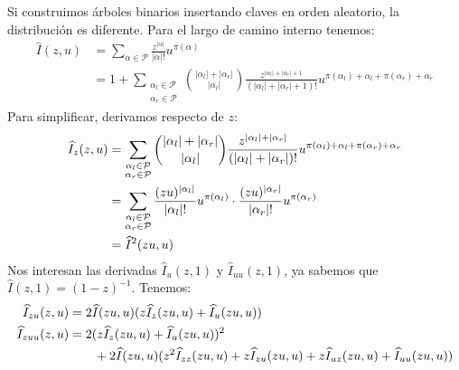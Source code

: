   Si construimos árboles binarios insertando claves en orden aleatorio,
  la distribución es diferente.
  Para el largo de camino interno tenemos:
  \begin{align}
    \widehat{I}(z, u)
      &= \sum_{\alpha \in \mathcal{P}}
	   \frac{z^{\lvert \alpha \rvert}}{\lvert \alpha \rvert !}
	   u^{\pi(\alpha)}
		 \label{eq:BST-IPL-mgf-def} \\
      &= 1 + \sum_{\substack{\alpha_l \in \mathcal{P} \\
			     \alpha_r \in \mathcal{P}}}
	       \binom{\lvert \alpha_l \rvert + \lvert \alpha_r \rvert}
		     {\lvert \alpha_l \rvert}
		 \frac{z^{\lvert \alpha_l \rvert + \lvert \alpha_r \rvert + 1}}
		      {(\lvert \alpha_l \rvert + \lvert \alpha_r \rvert + 1)!}
		 u^{\pi(\alpha_l) + \alpha_l + \pi(\alpha_r) + \alpha_r}
		 \label{eq:BST-IPL-mgf-decomposed}
  \end{align}
  Para simplificar,
  derivamos respecto de \(z\):
  \begin{align}
    \widehat{I}_z(z, u)
      &= \sum_{\substack{\alpha_l \in \mathcal{P} \\
			 \alpha_r \in \mathcal{P}}}
	   \binom{\lvert \alpha_l \rvert + \lvert \alpha_r \rvert}
		 {\lvert \alpha_l \rvert}
	     \frac{z^{\lvert \alpha_l \rvert + \lvert \alpha_r \rvert}}
		  {(\lvert \alpha_l \rvert + \lvert \alpha_r \rvert)!}
	     u^{\pi(\alpha_l) + \alpha_l + \pi(\alpha_r) + \alpha_r}
		 \notag \\
      &= \sum_{\substack{\alpha_l \in \mathcal{P} \\
			 \alpha_r \in \mathcal{P}}}
	   \frac{(z u)^{\lvert \alpha_l \rvert}}
		{\lvert \alpha_l \rvert !}
	   u^{\pi(\alpha_l)}
	     \cdot \frac{(z u)^{\lvert \alpha_r \rvert}}
			{\lvert \alpha_r \rvert !}
		   u^{\pi(\alpha_r)} \notag \\
      &= \widehat{I}^2(z u, u)
		 \label{eq:BST-IPL-mgf-z-decomposed}
  \end{align}
  Nos interesan las derivadas \(\widehat{I}_u(z, 1)\)
  y \(\widehat{I}_{u u}(z, 1)\),
  ya sabemos que \(\widehat{I}(z, 1) = (1 - z)^{-1}\).
  Tenemos:
  \begin{align}
    \widehat{I}_{z u}(z, u)
      &= 2 \widehat{I}(z u, u)
	   (z \widehat{I}_z(z u, u) + \widehat{I}_u(z u, u))
	     \label{eq:I_zu} \\
    \widehat{I}_{z u u}(z, u)
      &= 2 (z \widehat{I}_z(z u, u) + \widehat{I}_u(z u, u))^2 \notag \\
      &\qquad  + 2 \widehat{I}(z u, u)
		 (z^2 \widehat{I}_{z z}(z u, u)
		     + z \widehat{I}_{z u}(z u, u)
		     + z \widehat{I}_{u z}(z u, u)
		     + \widehat{I}_{u u}(z u, u))
	     \label{eq:I_zuu}
  \end{align}
